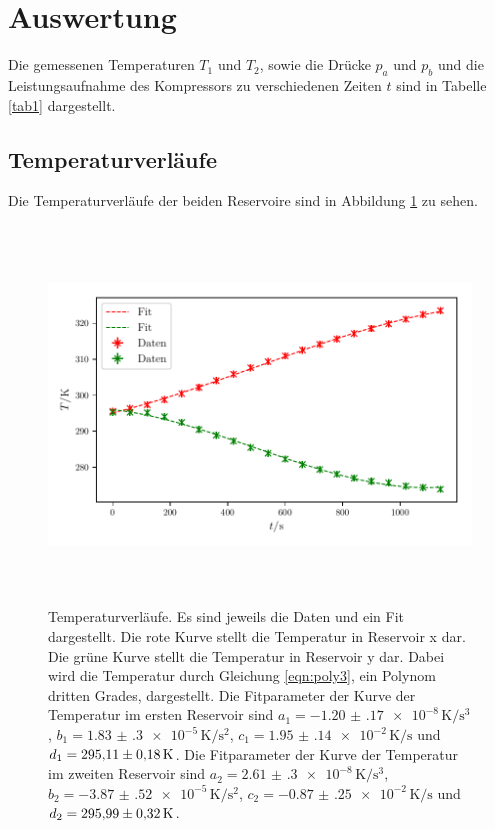 \section{Auswertung}
\label{sec:Auswertung}

Die gemessenen Temperaturen $T_1$ und $T_2$, sowie die Drücke
$p_a$ und $p_b$ und die Leistungsaufnahme des Kompressors
zu verschiedenen Zeiten $t$ sind in Tabelle \ref{tab1}
dargestellt.


\subsection{Temperaturverläufe}
Die Temperaturverläufe der beiden Reservoire sind in Abbildung
\ref{fig:plot1} zu sehen.

\begin{figure} %
    \centering
    \includegraphics[width=14cm, height=10cm]{build/plot1.pdf}
    \caption{Temperaturverläufe. Es sind jeweils die Daten und ein Fit dargestellt.
    Die rote Kurve stellt die Temperatur in Reservoir x dar. Die grüne Kurve stellt 
    die Temperatur in Reservoir y dar. Dabei wird die Temperatur
    durch Gleichung \ref{eqn:poly3}, ein Polynom dritten Grades, dargestellt. 
    Die Fitparameter der Kurve der Temperatur im ersten Reservoir sind $a_1=\num{-1.20(17)e-8} \, \si{\kelvin\per\cubic\second}$,
    $b_1=\num{1.83(30)e-5}\, \si{\kelvin\per\square\second}$, $c_1=\num{1.95(14)e-2} \, \si{\kelvin\per\second}$ und $d_1=\num{295.11 \pm 0.18} \, \si{\kelvin}$.
    Die Fitparameter der Kurve der Temperatur im zweiten Reservoir sind $a_2=\num{2.61(30)e-8} \, \si{\kelvin\per\cubic\second}$,
$b_2=\num{-3.87(52)e-5} \, \si{\kelvin\per\square\second}$, $c_2=\num{-0.87(25)e-2} \, \si{\kelvin\per\second}$ und $d_2=\num{295.99 \pm 0.32} \, \si{\kelvin}$.} %

    \label{fig:plot1}
\end{figure}

